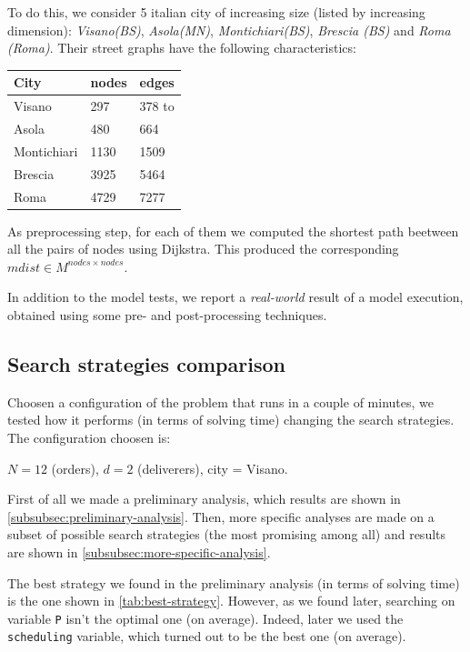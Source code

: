 \documentclass[10pt]{article}
\begin{document}
	To do this, we consider 5 italian city of increasing size (listed by increasing dimension): 
	\textit{Visano(BS)}, \textit{Asola(MN)}, \textit{Montichiari(BS)}, \textit{Brescia (BS)} and \textit{Roma (Roma)}.
	Their street graphs have the following characteristics:%
	\begin{table}[h]
		\centering
		\begin{tabular}{l|ll}
			City & nodes & edges \\
			\hline
			Visano & 297 & 378 to\\
			Asola & 480 & 664 \\
			Montichiari & 1130 & 1509 \\
			Brescia & 3925 & 5464 \\
			Roma & 4729 & 7277 \\
		\end{tabular}		
	\end{table}
	
	As preprocessing step, for each of them we computed the shortest path beetween all the pairs
	of nodes using Dijkstra. This produced the corresponding $mdist \in M^{nodes \times nodes}$.

	In addition to the model tests, we report a \textit{real-world} result of a model execution, obtained using some pre- and post-processing techniques.  

	\subsection{Search strategies comparison}
	\label{subsec:test-strategies}
	Choosen a configuration of the problem that runs in a couple of minutes,
	we tested how it performs (in terms of solving time) changing the search strategies.
	The configuration choosen is:
	\begin{center}
		$N = 12$ (orders), $d = 2$ (deliverers), city = Visano.		
	\end{center}

	First of all we made a preliminary analysis, which results are shown in
	\cref{subsubsec:preliminary-analysis}. Then, more specific analyses
	are made on a subset of possible search strategies (the most promising among all)
	and results are shown in \cref{subsubsec:more-specific-analysis}.

	The best strategy we found in the preliminary analysis (in terms of solving time) is the one shown
	in \cref{tab:best-strategy}. However, as we found later, searching on variable \texttt{P}
	isn't the optimal one (on average). 
	Indeed, later we used the \texttt{scheduling} variable, which turned out to be 
	the best one (on average).
\end{document}
